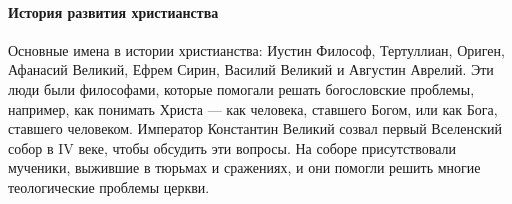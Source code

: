 \paragraph{История развития христианства}

Основные имена в истории христианства: Иустин Философ, Тертуллиан, Ориген, Афанасий Великий, Ефрем Сирин, Василий Великий и Августин Аврелий. Эти люди были философами, которые помогали решать богословские проблемы, например, как понимать Христа --- как человека, ставшего Богом, или как Бога, ставшего человеком.
Император Константин Великий созвал первый Вселенский собор в IV веке, чтобы обсудить эти вопросы. На соборе присутствовали мученики, выжившие в тюрьмах и сражениях, и они помогли решить многие теологические проблемы церкви.

